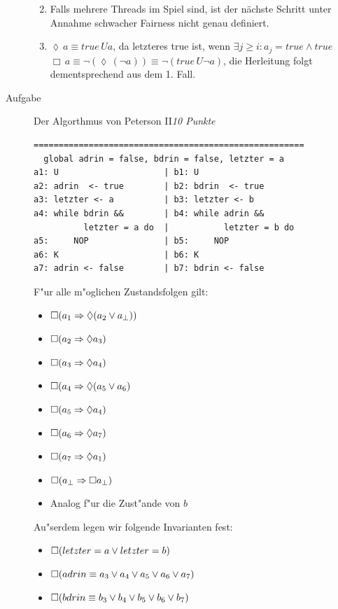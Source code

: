 \documentclass[a4paper,twoside,12pt]{article}
\newcounter{AUFGNR}
\newcommand{\AUFGABE}[2]{\vspace{0.3cm}\item[Aufgabe~\arabic{AUFGNR}]\stepcounter{AUFGNR} #1\hfill\emph{#2}}
\begin{document}
\begin{description}
\begin{enumerate}
\begin{enumerate}
\end{enumerate}

\item 
Falls mehrere Threads im Spiel sind, ist der nächste Schritt unter Annahme schwacher Fairness nicht genau definiert.

\item
$ \lozenge\, a \equiv true\, Ua$, da letzteres true ist, wenn $\exists j\geq i: a_j = true \land true $\\

$ \Box\, a \equiv \neg (\lozenge\, (\neg a)) \equiv \neg (true\, U\neg a)$, die Herleitung folgt dementsprechend aus dem 1. Fall.\\

\end{enumerate}

\AUFGABE{Der Algorthmus von Peterson II}{10 Punkte}
\begin{verbatim}
======================================================
  global adrin = false, bdrin = false, letzter = a
a1: U                     | b1: U
a2: adrin  <- true        | b2: bdrin  <- true
a3: letzter <- a          | b3: letzter <- b
a4: while bdrin &&        | b4: while adrin &&
          letzter = a do  |           letzter = b do
a5:     NOP               | b5:     NOP
a6: K                     | b6: K
a7: adrin <- false        | b7: bdrin <- false
\end{verbatim}
F"ur alle m"oglichen Zustandsfolgen gilt:
\begin{itemize}
	\item $\Box(a_1 \Rightarrow \lozenge (a_2 \vee a_\bot))$
	\item $\Box(a_2 \Rightarrow \lozenge a_3)$
	\item $\Box(a_3 \Rightarrow \lozenge a_4)$
	\item $\Box(a_4 \Rightarrow \lozenge (a_5 \vee a_6)$
	\item $\Box(a_5 \Rightarrow \lozenge a_4)$
	\item $\Box(a_6 \Rightarrow \lozenge a_7)$
	\item $\Box(a_7 \Rightarrow \lozenge a_1)$
	\item $\Box(a_\bot \Rightarrow \Box a_\bot)$
	\item Analog f"ur die Zust"ande von $b$
\end{itemize}

Au"serdem legen wir folgende Invarianten fest:
\begin{itemize}
	\item $\Box(letzter = a \vee letzter = b)$
	\item $\Box(adrin \equiv a_3 \vee a_4 \vee a_5 \vee a_6 \vee a_7)$
	\item $\Box(bdrin \equiv b_3 \vee b_4 \vee b_5 \vee b_6 \vee b_7)$
\end{itemize}


\end{description}
\end{document}

